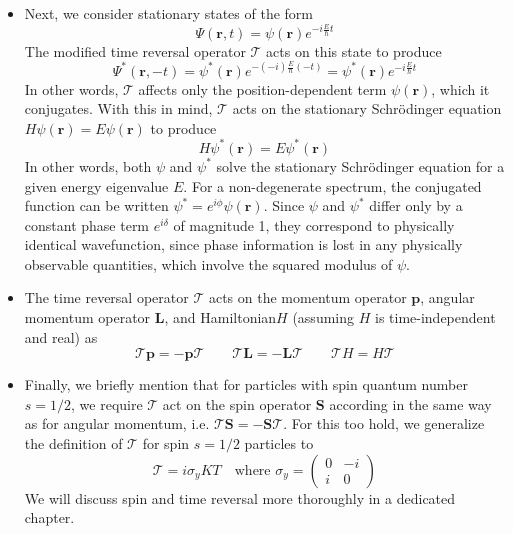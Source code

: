 \documentclass[11pt, a4paper]{article}
\newcommand{\Schro}{Schr\"{o}dinger\xspace}
\newcommand{\Ham}{Hamiltonian\xspace}
\renewcommand{\vec}[1]{\bm{#1}}  %
\renewcommand{\r}{\vec{r}}  %
\newcommand{\T}{\mathcal{T}}  %
\newcommand{\p}{\psi}  %
\renewcommand{\P}{\Psi}  %
\begin{document}
\begin{itemize}
	\item Next, we consider stationary states of the form
	\begin{equation*}
		\P(\r, t) = \p(\r)e^{-i\frac{E}{\hbar}t}
	\end{equation*}
	The modified time reversal operator $ \T $ acts on this state to produce
	\begin{equation*}
		\P^{*}(\r, -t) = \p^{*}(\r)e^{-(-i)\frac{E}{\hbar}(-t)} = \p^{*}(\r)e^{-i\frac{E}{\hbar}t}
	\end{equation*}
	In other words, $ \T $ affects only the position-dependent term $ \p(\r) $, which it conjugates. With this in mind,	$ \T $ acts on the stationary \Schro equation $ H \p(\r) = E\p(\r) $ to produce
	\begin{equation*}
		 H \p^{*}(\r) = E\p^{*}(\r) 
	\end{equation*}
	In other words, both $ \p $ and $ \p^{*} $ solve the stationary \Schro equation for a given energy eigenvalue $ E $. For a non-degenerate spectrum, the conjugated function can be written $ \p^{*} = e^{i\phi}\p(\r) $. Since $ \p $ and $ \p^{*} $ differ only by a constant phase term $ e^{i\delta} $ of magnitude 1, they correspond to physically identical wavefunction, since phase information is lost in any physically observable quantities, which involve the squared modulus of $ \p $.
	
	\item The time reversal operator $ \T $ acts on the momentum operator $ \vec{p} $, angular momentum operator $ \vec{L} $, and \Ham $ H $ (assuming $ H $ is time-independent and real) as
	\begin{equation*}
		\T \vec{p} = - \vec{p} \T \qquad \T \vec{L} = - \vec{L} \T \qquad \T H = H \T
	\end{equation*}
	
	\item Finally, we briefly mention that for particles with spin quantum number $ s = 1/2 $, we require $ \T $ act on the spin operator $ \vec{S} $ according in the same way as for angular momentum, i.e. $ \T \vec{S} = - \vec{S} \T $. For this too hold, we generalize the definition of $ \T $ for spin $ s = 1/2 $ particles to
	\begin{equation*}
		\T = i \sigma_{y} K T \quad \text{where }  \sigma_{y} = 
		\begin{pmatrix}
			0 & - i\\
			i & 0
		\end{pmatrix}
	\end{equation*}
	We will discuss spin and time reversal more thoroughly in a dedicated chapter. 
	

\end{itemize}
\end{document}
